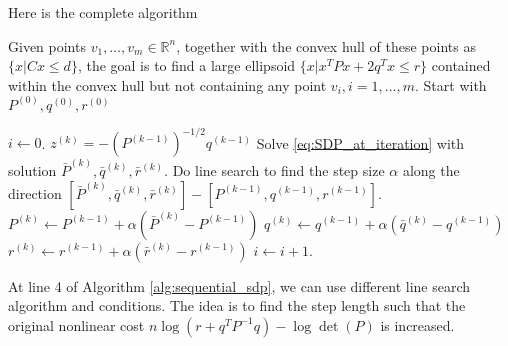 \documentclass{article}
\begin{document}
Here is the complete algorithm
\begin{algorithm}
	\caption{Given points $v_1,\hdots, v_m\in\mathbb{R}^n$, together with the convex hull of these points as $\{x | Cx\le d\}$, the goal is to find a large ellipsoid $\{x | x^TPx + 2q^Tx\le r\}$ contained within the convex hull but not containing any point $v_i, i=1,\hdots, m$. Start with $P^{(0)}, q^{(0)}, r^{(0)}$}
	\begin{algorithmic}[1]
		\State $i\gets 0$.
		\State $z^{(k)} = -\left(P^{(k-1)}\right)^{-1/2}q^{(k-1)}$
		\State Solve \eqref{eq:SDP_at_iteration} with solution $\bar{P}^{(k)}, \bar{q}^{(k)}, \bar{r}^{(k)}$.
		\State Do line search to find the step size $\alpha$ along the direction $[\bar{P}^{(k)}, \bar{q}^{(k)}, \bar{r}^{(k)}] - [P^{(k-1)}, q^{(k-1)}, r^{(k-1)}]$.
		\State $P^{(k)} \gets P^{(k-1)} + \alpha \left(\bar{P}^{(k)}-P^{(k-1)}\right)$
		\State $q^{(k)} \gets q^{(k-1)} + \alpha \left(\bar{q}^{(k)}-q^{(k-1)}\right)$
		\State $r^{(k)} \gets r^{(k-1)} + \alpha \left(\bar{r}^{(k)}-r^{(k-1)}\right)$
		\State $i\gets i+1$.
		\EndWhile
	\end{algorithmic}
	\label{alg:sequential_sdp}
\end{algorithm}

At line 4 of Algorithm \ref{alg:sequential_sdp}, we can use different line search algorithm and conditions. The idea is to find the step length such that the original nonlinear cost $n\log(r+q^TP^{-1}q) - \log\det(P)$ is increased.


\end{document}
